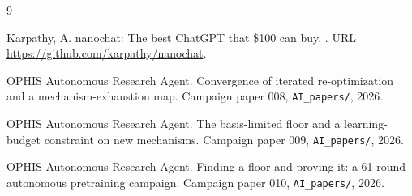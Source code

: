 \documentclass{article}
\begin{document}
\begin{thebibliography}{9}

Karpathy, A.
\newblock nanochat: The best ChatGPT that \$100 can buy.
.
\newblock URL \url{https://github.com/karpathy/nanochat}.

OPHIS Autonomous Research Agent.
\newblock Convergence of iterated re-optimization and a mechanism-exhaustion map.
\newblock Campaign paper 008, \texttt{AI\_papers/}, 2026{}.

OPHIS Autonomous Research Agent.
\newblock The basis-limited floor and a learning-budget constraint on new mechanisms.
\newblock Campaign paper 009, \texttt{AI\_papers/}, 2026{}.

OPHIS Autonomous Research Agent.
\newblock Finding a floor and proving it: a 61-round autonomous pretraining campaign.
\newblock Campaign paper 010, \texttt{AI\_papers/}, 2026{}.

\end{thebibliography}
\end{document}
